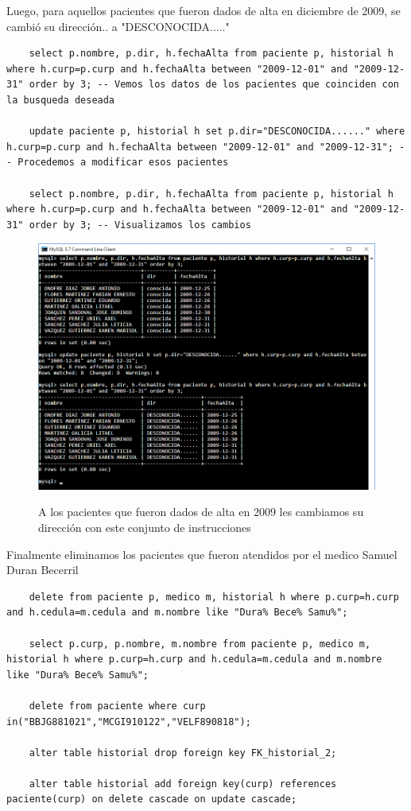\documentclass[12pt, titlepage]{article}
\begin{document}
	Luego, para aquellos pacientes que fueron dados de alta en diciembre de 2009, se cambió su dirección.. a "DESCONOCIDA....."
	\begin{lstlisting}
	select p.nombre, p.dir, h.fechaAlta	from paciente p, historial h where h.curp=p.curp and h.fechaAlta between "2009-12-01" and "2009-12-31" order by 3; -- Vemos los datos de los pacientes que coinciden con la busqueda deseada
	
	update paciente p, historial h set p.dir="DESCONOCIDA......" where h.curp=p.curp and h.fechaAlta between "2009-12-01" and "2009-12-31"; -- Procedemos a modificar esos pacientes
	
	select p.nombre, p.dir, h.fechaAlta	from paciente p, historial h where h.curp=p.curp and h.fechaAlta between "2009-12-01" and "2009-12-31" order by 3; -- Visualizamos los cambios
	\end{lstlisting}
	\begin{figure}[H]
		\begin{center}
			\includegraphics[width=\textwidth]{img/19.png}
			\label{fig:19}
			\caption{A los pacientes que fueron dados de alta en 2009 les cambiamos su dirección con este conjunto de instrucciones}
		\end{center}
	\end{figure}
	Finalmente eliminamos los pacientes que fueron atendidos por el medico Samuel Duran Becerril
	\begin{lstlisting}
	delete from paciente p, medico m, historial h where p.curp=h.curp and h.cedula=m.cedula and m.nombre like "Dura% Bece% Samu%";
	
	select p.curp, p.nombre, m.nombre from paciente p, medico m, historial h where p.curp=h.curp and h.cedula=m.cedula and m.nombre like "Dura% Bece% Samu%";
	
	delete from paciente where curp in("BBJG881021","MCGI910122","VELF890818");
	
	alter table historial drop foreign key FK_historial_2;
	
	alter table historial add foreign key(curp) references paciente(curp) on delete cascade on update cascade;
	\end{lstlisting}
\end{document}
